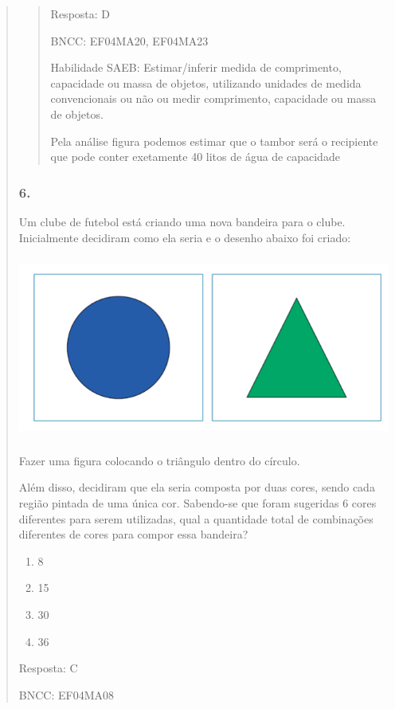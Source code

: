 \begin{enumerate}
\begin{escolha}
\begin{enumerate}
\begin{itemize}
\begin{itemize}
\begin{escolha}
\begin{quote}
\begin{escolha}
{\begin{quote}
Resposta: D

BNCC: EF04MA20, EF04MA23

Habilidade SAEB: Estimar/inferir medida de comprimento, capacidade ou
massa de objetos, utilizando unidades de medida convencionais ou não ou
medir comprimento, capacidade ou massa de objetos.

Pela análise figura podemos estimar que o tambor será o recipiente que
pode conter exetamente 40 litos de água de capacidade
\end{quote}

\subsubsection{6. }\label{section-192}

Um clube de futebol está criando uma nova bandeira para o clube.
Inicialmente decidiram como ela seria e o desenho abaixo foi criado:

\includegraphics[width=5.26712in,height=2.37521in]{media/image167.png}

Fazer uma figura colocando o triângulo dentro do círculo.

Além disso, decidiram que ela seria composta por duas cores, sendo cada
região pintada de uma única cor. Sabendo-se que foram sugeridas 6 cores
diferentes para serem utilizadas, qual a quantidade total de combinações
diferentes de cores para compor essa bandeira?

\begin{enumerate}
\def\labelenumi{\alph{enumi})}
\item
  8
\item
  15
\item
  30
\item
  36
\end{enumerate}

Resposta: C

BNCC: EF04MA08

}
\end{escolha}
\end{quote}
\end{escolha}
\end{itemize}
\end{itemize}
\end{enumerate}
\end{escolha}
\end{enumerate}

